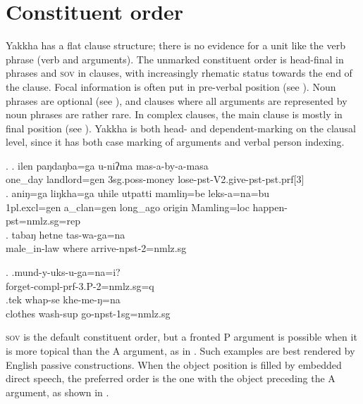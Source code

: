  
\section{Constituent order}\label{simp-cl2}

Yakkha has a flat clause structure; there is no evidence for  a unit like the verb phrase (verb and arguments). The unmarked constituent order is head-final in phrases and \textsc{sov} in clauses, with increasingly rhematic status towards the end of the clause. Focal information is often put in pre-verbal position (see \Next). Noun phrases are optional (see \NNext[a]), and clauses where all arguments are represented by noun phrases are rather rare. In complex clauses, the main clause is mostly in final position (see \NNext[b]). Yakkha is both head- and dependent-marking on the clausal level, since it has both case marking of arguments and verbal person indexing. 

\ex. \ag. ilen paŋdaŋba=ga    u-niʔma   mas-a-by-a-masa\\
 one\_day landlord{\sc =gen} {\sc 3sg.poss-}money lose{\sc -pst-V2.give-pst-pst.prf[3]}\\
 \bg.  aniŋ=ga         liŋkha=ga      uhile         utpatti mamliŋ=be      leks-a=na=bu\\
 	{\sc 1pl.excl=gen}  a\_clan{\sc =gen} long\_ago origin  Mamling{\sc =loc} happen{\sc -pst=nmlz.sg=rep}\\
 	 
 \bg. tabaŋ hetne tas-wa-ga=na\\
 	male\_in-law where arrive-{\sc npst-2=nmlz.sg}\\
 
 \ex. \ag.mund-y-uks-u-ga=na=i?\\
 forget{\sc -compl-prf-3.P-2=nmlz.sg=q}\\
 \bg.tek whap-se khe-me-ŋ=na\\
clothes wash{\sc -sup} go{\sc -npst-1sg=nmlz.sg}\\

 
\textsc{sov} is the default constituent order, but a fronted P argument is possible when it is more topical than the A argument, as in  \Next[a]. Such examples are best rendered by English passive constructions. When the object position is filled by embedded direct speech, the preferred order is the one with the object preceding the A argument, as shown in \Next[b]. 

